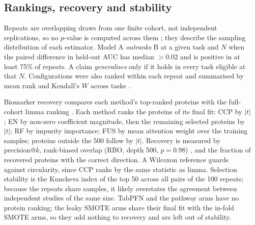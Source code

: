 \documentclass[10pt,letterpaper]{article}
\begin{document}
\subsection{Rankings, recovery and stability}
Repeats are overlapping draws from one finite cohort, not independent replications, so no $p$-value is
computed across them \citep{nadeau2003inference}; they describe the sampling distribution of each estimator.
Model A \emph{outranks} B at a given task and $N$ when the paired difference in held-out AUC has median
$> 0.02$ and is positive in at least 75\% of repeats. A claim \emph{generalises} only if it holds in every task
eligible at that $N$. Configurations were also ranked within each repeat and summarised by mean rank and
Kendall's $W$ across tasks \citep{demsar2006comparisons}.

Biomarker recovery compares each method's top-ranked proteins with the full-cohort limma ranking
\citep{ritchie2015limma}. Each method ranks the proteins of its final fit: CCP by $|t|$; EN by non-zero
coefficient magnitude, then the remaining selected proteins by $|t|$; RF by impurity importance; FUS by mean
attention weight over the training samples; proteins outside the 500 follow by $|t|$. Recovery is measured by
precision@$k$, rank-biased overlap (RBO, depth 500, $p = 0.98$) \citep{webber2010rbo}, and the fraction of
recovered proteins with the correct direction. A Wilcoxon reference guards against circularity, since CCP
ranks by the same statistic as limma. Selection stability is the Kuncheva index \citep{kuncheva2007stability}
of the top 50 across all pairs of the 100 repeats; because the repeats share samples, it likely overstates the
agreement between independent studies of the same size. TabPFN and the pathway arms have no protein
ranking; the leaky SMOTE arms share their final fit with the in-fold SMOTE arms, so they add nothing to
recovery and are left out of stability.
\end{document}
